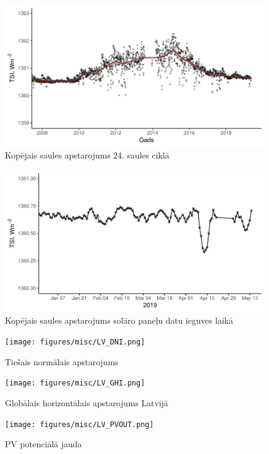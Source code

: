 \begin{figure}[h]
    \centering
    \includegraphics[width=\linewidth]{figures/misc/TSI_8-19.pdf}
    \caption{Kopējais saules apstarojums 24. saules ciklā \cite{TSIdata}}
    \label{fig:TSI1}
\end{figure}

\begin{figure}[h]
    \centering
    \includegraphics[width=\linewidth]{figures/misc/TSI.pdf}
    \caption{Kopējais saules apstarojums solāro paneļu datu ieguves laikā \cite{TSIdata}}
    \label{fig:TSI2}
\end{figure}

\begin{figure}[h]
    \centering
    \texttt{[image: figures/misc/LV\_DNI.png]}
    \caption{Tiešais normālais apstarojums \cite{solargis}}
    \label{fig:lv_DNI}
\end{figure}
\begin{figure}[h]
    \centering
    \texttt{[image: figures/misc/LV\_GHI.png]}
    \caption{Globālais horizontālais apstarojums Latvijā \cite{solargis}}
    \label{fig:lv_GHI}
\end{figure}
\begin{figure}[h]
    \centering
    \texttt{[image: figures/misc/LV\_PVOUT.png]}
    \caption{PV potenciālā jauda \cite{solargis}}
    \label{fig:lv_PVOUT}
\end{figure}
